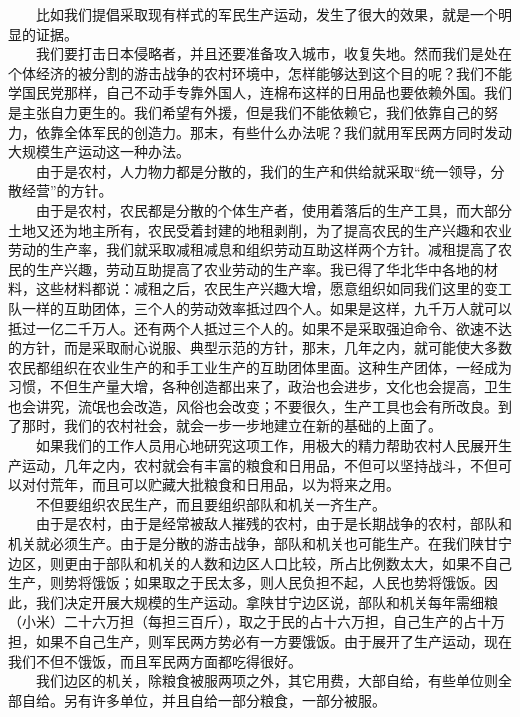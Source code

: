 \documentclass[cn,11pt,chinese]{elegantbook}
\begin{document}
　　比如我们提倡采取现有样式的军民生产运动，发生了很大的效果，就是一个明显的证据。\\
　　我们要打击日本侵略者，并且还要准备攻入城市，收复失地。然而我们是处在个体经济的被分割的游击战争的农村环境中，怎样能够达到这个目的呢？我们不能学国民党那样，自己不动手专靠外国人，连棉布这样的日用品也要依赖外国。我们是主张自力更生的。我们希望有外援，但是我们不能依赖它，我们依靠自己的努力，依靠全体军民的创造力。那末，有些什么办法呢？我们就用军民两方同时发动大规模生产运动这一种办法。\\
　　由于是农村，人力物力都是分散的，我们的生产和供给就采取“统一领导，分散经营”的方针。\\
　　由于是农村，农民都是分散的个体生产者，使用着落后的生产工具，而大部分土地又还为地主所有，农民受着封建的地租剥削，为了提高农民的生产兴趣和农业劳动的生产率，我们就采取减租减息和组织劳动互助这样两个方针。减租提高了农民的生产兴趣，劳动互助提高了农业劳动的生产率。我已得了华北华中各地的材料，这些材料都说：减租之后，农民生产兴趣大增，愿意组织如同我们这里的变工队一样的互助团体，三个人的劳动效率抵过四个人。如果是这样，九千万人就可以抵过一亿二千万人。还有两个人抵过三个人的。如果不是采取强迫命令、欲速不达的方针，而是采取耐心说服、典型示范的方针，那末，几年之内，就可能使大多数农民都组织在农业生产的和手工业生产的互助团体里面。这种生产团体，一经成为习惯，不但生产量大增，各种创造都出来了，政治也会进步，文化也会提高，卫生也会讲究，流氓也会改造，风俗也会改变；不要很久，生产工具也会有所改良。到了那时，我们的农村社会，就会一步一步地建立在新的基础的上面了。\\
　　如果我们的工作人员用心地研究这项工作，用极大的精力帮助农村人民展开生产运动，几年之内，农村就会有丰富的粮食和日用品，不但可以坚持战斗，不但可以对付荒年，而且可以贮藏大批粮食和日用品，以为将来之用。\\
　　不但要组织农民生产，而且要组织部队和机关一齐生产。\\
　　由于是农村，由于是经常被敌人摧残的农村，由于是长期战争的农村，部队和机关就必须生产。由于是分散的游击战争，部队和机关也可能生产。在我们陕甘宁边区，则更由于部队和机关的人数和边区人口比较，所占比例数太大，如果不自己生产，则势将饿饭；如果取之于民太多，则人民负担不起，人民也势将饿饭。因此，我们决定开展大规模的生产运动。拿陕甘宁边区说，部队和机关每年需细粮（小米）二十六万担（每担三百斤），取之于民的占十六万担，自己生产的占十万担，如果不自己生产，则军民两方势必有一方要饿饭。由于展开了生产运动，现在我们不但不饿饭，而且军民两方面都吃得很好。\\
　　我们边区的机关，除粮食被服两项之外，其它用费，大部自给，有些单位则全部自给。另有许多单位，并且自给一部分粮食，一部分被服。\\
\end{document}
